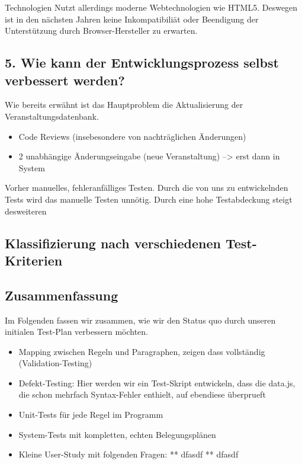 \documentclass[]{article}
\begin{document}
Technologien Nutzt allerdings moderne Webtechnologien wie HTML5.
Deswegen ist in den nächsten Jahren keine Inkompatibiliät oder
Beendigung der Unterstützung durch Browser-Hersteller zu erwarten.

\subsection{5. Wie kann der Entwicklungsprozess selbst verbessert
werden?}\label{wie-kann-der-entwicklungsprozess-selbst-verbessert-werden}

Wie bereits erwähnt ist das Hauptproblem die Aktualisierung der
Veranstaltungsdatenbank.

\begin{itemize}
\itemsep1pt\parskip0pt
\item
  Code Reviews (insebesondere von nachträglichen Änderungen)
\item
  2 unabhängige Änderungseingabe (neue Veranstaltung) --\textgreater{}
  erst dann in System
\end{itemize}

Vorher manuelles, fehleranfälliges Testen. Durch die von uns zu
entwickelnden Tests wird das manuelle Testen unnötig. Durch eine hohe
Testabdeckung steigt desweiteren

\subsection{Klassifizierung nach verschiedenen
Test-Kriterien}\label{klassifizierung-nach-verschiedenen-test-kriterien}

\subsection{Zusammenfassung}\label{zusammenfassung}

Im Folgenden fassen wir zusammen, wie wir den Status quo durch unseren
initialen Test-Plan verbessern möchten.

\begin{itemize}
\itemsep1pt\parskip0pt
\item
  Mapping zwischen Regeln und Paragraphen, zeigen dass vollständig
  (Validation-Testing)
\item
  Defekt-Testing: Hier werden wir ein Test-Skript entwickeln, dass die
  data.js, die schon mehrfach Syntax-Fehler enthielt, auf ebendiese
  überprueft
\item
  Unit-Tests für jede Regel im Programm
\item
  System-Tests mit kompletten, echten Belegungsplänen
\item
  Kleine User-Study mit folgenden Fragen: ** dfasdf ** dfasdf
\end{itemize}
\end{document}
